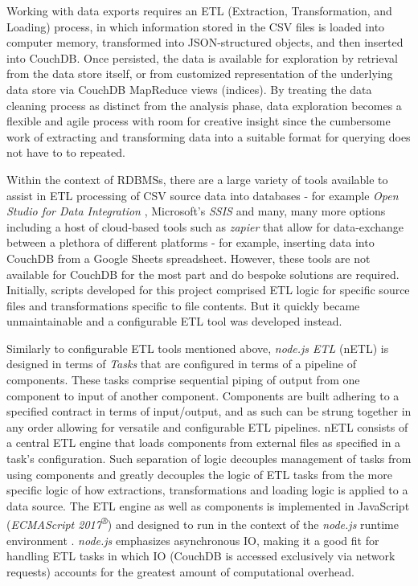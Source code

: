 Working with data exports requires an ETL (Extraction, Transformation, and Loading) process, in which information stored in the CSV files is loaded into computer memory, transformed into JSON-structured objects, and then inserted into CouchDB. Once persisted, the data is available for exploration by retrieval from the data store itself, or from customized representation of the underlying data store via CouchDB MapReduce views (indices). By treating the data cleaning process as distinct from the analysis phase, data exploration becomes a flexible and agile process with room for creative insight since the cumbersome work of extracting and transforming data into a suitable format for querying does not have to to repeated.

Within the context of RDBMSs, there are a large variety of tools available to assist in ETL processing of CSV source data into databases - for example \textit{Open Studio for Data Integration} \cite{talend}, Microsoft's \textit{SSIS} \cite{ssis} and many, many more options including a host of cloud-based tools such as \textit{zapier} \cite{zapier} that allow for data-exchange between a plethora of different platforms - for example, inserting data into CouchDB from a Google Sheets spreadsheet. However, these tools are not available for CouchDB for the most part and do bespoke solutions are required. Initially, scripts developed for this project comprised ETL logic for specific source files and transformations specific to file contents. But it quickly became unmaintainable and a configurable ETL tool was developed instead.

Similarly to configurable ETL tools mentioned above, \textit{node.js ETL} (nETL) is designed in terms of \textit{Tasks} that are configured in terms of a pipeline of components. These tasks comprise sequential piping of output from one component to input of another component. Components are built adhering to a specified contract in terms of input/output, and as such can be strung together in any order allowing for versatile and configurable ETL pipelines. nETL consists of a central ETL engine that loads components from external files as specified in a task's configuration. Such separation of logic decouples management of tasks from using components and greatly decouples the logic of ETL tasks from the more specific logic of how extractions, transformations and loading logic is applied to a data source. The ETL engine as well as components is implemented in JavaScript (\textit{ECMAScript 2017\textsuperscript{®}}) \cite{ecmascript2017} and designed to run in the context of the \textit{node.js} runtime environment \cite{nodejs}. \textit{node.js} emphasizes asynchronous IO, making it a good fit for handling ETL tasks in which IO (CouchDB is accessed exclusively via network requests) accounts for the greatest amount of computational overhead.